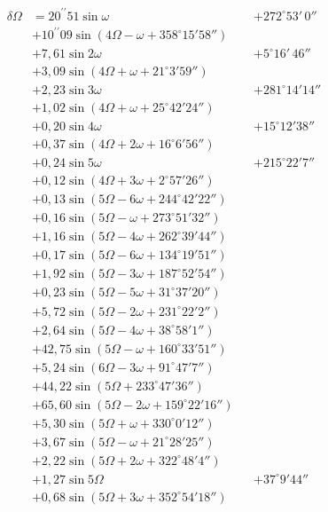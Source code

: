 \documentclass[10pt,a4paper]{article}
\begin{document}
\begin{align*}
\delta\Omega &= 20^{\prime\prime}51 \sin \omega &&+ 272^{\circ}53'\,0'' \\
&+ 10^{\prime\prime}09 \sin(4\Omega - \omega + 358^{\circ}15'58'') \\
&+ 7,61 \sin 2\omega &&+ 5^{\circ}16'\,46'' \\
&+ 3,09 \sin(4\Omega + \omega + 21^{\circ}3'59'') \\
&+ 2,23 \sin 3\omega &&+ 281^{\circ}14'14'' \\
&+ 1,02 \sin(4\Omega + \omega + 25^{\circ}42'24'') \\
&+ 0,20 \sin 4\omega &&+ 15^{\circ}12'38'' \\
&+ 0,37 \sin(4\Omega + 2\omega + 16^{\circ}6'56'') \\
&+ 0,24 \sin 5\omega &&+ 215^{\circ}22'7'' \\
&+ 0,12 \sin(4\Omega + 3\omega + 2^{\circ}57'26'') \\
&+ 0,13 \sin(5\Omega - 6\omega + 244^{\circ}42'22'') \\
&+ 0,16 \sin(5\Omega - \omega + 273^{\circ}51'32'') \\
&+ 1,16 \sin(5\Omega - 4\omega + 262^{\circ}39'44'') \\
&+ 0,17 \sin(5\Omega - 6\omega + 134^{\circ}19'51'') \\
&+ 1,92 \sin(5\Omega - 3\omega + 187^{\circ}52'54'') \\
&+ 0,23 \sin(5\Omega - 5\omega + 31^{\circ}37'20'') \\
&+ 5,72 \sin(5\Omega - 2\omega + 231^{\circ}22'2'') \\
&+ 2,64 \sin(5\Omega - 4\omega + 38^{\circ}58'1'') \\
&+ 42,75 \sin(5\Omega - \omega + 160^{\circ}33'51'') \\
&+ 5,24 \sin(6\Omega - 3\omega + 91^{\circ}47'7'') \\
&+ 44,22 \sin(5\Omega + 233^{\circ}47'36'') \\
&+ 65,60 \sin(5\Omega - 2\omega + 159^{\circ}22'16'') \\
&+ 5,30 \sin(5\Omega + \omega + 330^{\circ}0'12'') \\
&+ 3,67 \sin(5\Omega - \omega + 21^{\circ}28'25'') \\
&+ 2,22 \sin(5\Omega + 2\omega + 322^{\circ}48'4'') \\
&+ 1,27 \sin 5\Omega &&+ 37^{\circ}9'44'' \\
&+ 0,68 \sin(5\Omega + 3\omega + 352^{\circ}54'18'') \\

\end{align*}
\end{document}
